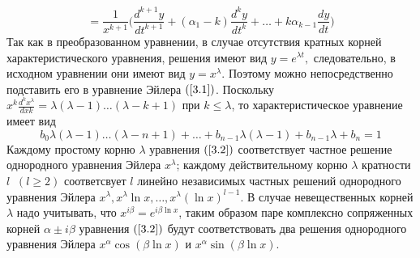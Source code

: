     \begin{equation}
= \frac{1}{x^{k+1}} \Big(\frac{d^{k+1} y}{dt^{k+1}}+(\alpha_1 - k) \frac{d^k y}{dt^k} + \dots + k \alpha_{k-1} \frac{dy}{dt}\Big)
\end{equation}
Так как в преобразованном уравнении, в случае отсутствия
кратных корней характеристического уравнения, решения имеют
вид $y=e^{\lambda t},$ следовательно, в исходном уравнении они имеют вид $y=x^\lambda$. Поэтому можно непосредственно подставить его в уравнение Эйлера $(\ref{3.1})$. Поскольку $x^k\frac{d^kx^\lambda}{dxk}=\lambda(\lambda-1)\dots(\lambda-k+1)$ при $k\leqslant\lambda$, то характеристическое уравнение имеет вид \begin{equation}
\tag{3.2}
\label{3.2}
    b_0\lambda(\lambda-1)\dots(\lambda-n+1)+\dots+b_{n-1}\lambda(\lambda-1)+b_{n-1}\lambda+b_n=1
\end{equation}
Каждому простому корню $\lambda$ уравнения $(\ref{3.2})$ соответствует частное решение однородного уравнения Эйлера $x^\lambda$; каждому действительному корню $\lambda$ кратности $l\;\;(l\geqslant2)$ соответсвует $l$ линейно
независимых частных решений однородного уравнения Эйлера $x^\lambda, x^\lambda\ln{x}, \dots, x^\lambda(\ln{x})^{l-1}$. В случае невещественных корней $\lambda$ надо
учитывать, что $x^{i\beta}=e^{i\beta\ln{x}}$, таким образом паре комплексно сопряженных
корней $\alpha\pm i\beta$ уравнения $(\ref{3.2})$ будут соответствовать два решения
однородного уравнения Эйлера $x^\alpha\cos{(\beta\ln x)}$ и $x^\alpha\sin{(\beta\ln{x})}$.
 
